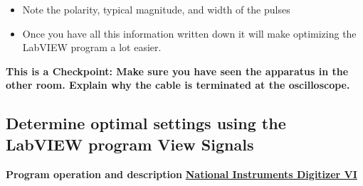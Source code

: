 \documentclass{../lab}
\begin{document}
\begin{enumerate}
\begin{itemize}
        \item Note the polarity, typical magnitude, and width of the pulses

        \item Once you have all this information written down it will make optimizing the LabVIEW program a lot easier.

    \end{itemize}

\end{enumerate}


\textbf{ This is a Checkpoint: Make sure you have seen the apparatus in the other room. Explain why the cable is terminated at the oscilloscope. }

\subsection{Determine optimal settings using the LabVIEW program View Signals}

\textbf{Program operation and description} \href{http://dev-physicsadv.pantheon.berkeley.edu/node/88}{\textbf{National Instruments Digitizer VI}}
\end{document}
